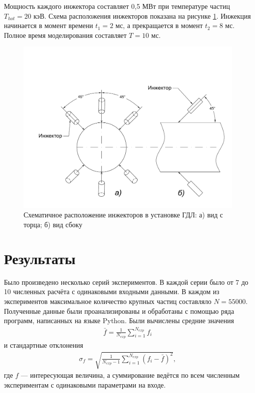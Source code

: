 Мощность каждого инжектора составляет 0,5 МВт при температуре частиц $T_{hot} = 20 \text{ кэВ}$. Схема расположения инжекторов показана на рисунке \ref{fig:gdl}. Инжекция начинается в момент времени $t_1 = 2  \text{ мс}$, а прекращается в момент $t_2 = 8 \text{ мс}$. Полное время моделирования составляет $T = 10 \text{ мс}$.

\begin{figure}[h!]
	\centering
	\includegraphics[width=1.\linewidth]{fig/ch5/gdl}
	\caption{Схематичное расположение инжекторов в установке ГДЛ: а) вид с торца; б) вид сбоку}
	\label{fig:gdl}
\end{figure}


\section{Результаты}

Было произведено несколько серий экспериментов. В каждой серии было от 7 до 10 численных расчёта с одинаковыми входными данными.
В каждом из экспериментов максимальное количество крупных частиц составляло $N = 55000$. Полученные данные были проанализированы и обработаны с помощью ряда программ, написанных на языке Python. Были вычислены средние значения
\begin{eqnarray}
	\bar{f} = \frac{1}{N_{exp}} \sum_{i = 1}^{N_{exp}} f_i 
\end{eqnarray}
и стандартные отклонения
\begin{eqnarray}
	\sigma_f = \sqrt{\frac{1}{N_{exp} - 1} \sum_{i = 1}^{N_{exp}} \left( f_i - \bar{f} \right)^2},
\end{eqnarray}
где $f$ --- интересующая величина, а суммирование ведётся по всем численным экспериментам с одинаковыми параметрами на входе.

